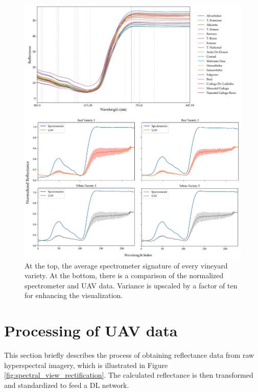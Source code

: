 \begin{figure}[ht]
    \centering
    \includegraphics[width=\linewidth]{figs/vineyard_classification/spectrometer_varieties.png}
	\caption{At the top, the average spectrometer signature of every vineyard variety. At the bottom, there is a comparison of the normalized spectrometer and UAV data. Variance is upscaled by a factor of ten for enhancing the visualization.}
	\label{fig:spectrometer_uav_data}
\end{figure}

\section{Processing of UAV data}

This section briefly describes the process of obtaining reflectance data from raw hyperspectral imagery, which is illustrated in Figure \ref{fig:spectral_view_rectification}. The calculated reflectance is then transformed and standardized to feed a DL network. 

